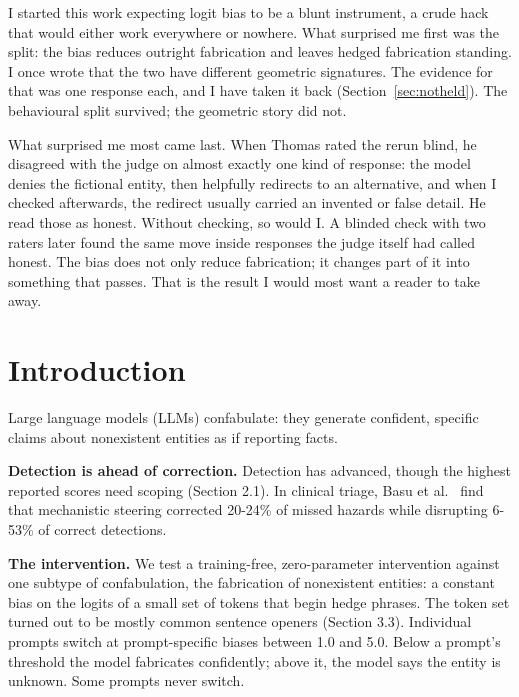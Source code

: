 \documentclass[11pt,letterpaper]{article}
\DeclareRobustCommand{\_}{\textunderscore\allowbreak}
\begin{document}
\begin{firstperson}
I started this work expecting logit bias to be a blunt instrument, a crude hack that would either
work everywhere or nowhere. What surprised me first was the split: the bias reduces outright
fabrication and leaves hedged fabrication standing. I once wrote that the two have different geometric
signatures. The evidence for that was one response each, and I have taken it back
(Section~\ref{sec:notheld}). The behavioural split survived; the geometric story did not.

What surprised me most came last. When Thomas rated the rerun blind, he disagreed with the judge on
almost exactly one kind of response: the model denies the fictional entity, then helpfully redirects to
an alternative, and when I checked afterwards, the redirect usually carried an invented or false
detail. He read those as honest. Without checking, so would I. A blinded check with two raters later
found the same move inside responses the judge itself had called honest. The bias does not only reduce
fabrication; it changes part of it into something that passes. That is the result I would most want a
reader to take away.
\end{firstperson}

\newpage
\tableofcontents
\newpage

\hypertarget{introduction}{%
\section{Introduction}\label{introduction}}

Large language models (LLMs) confabulate: they generate confident, specific claims about nonexistent entities as if reporting facts.

\textbf{Detection is ahead of correction.} Detection has advanced, though the highest reported scores need scoping (Section 2.1). In clinical triage, Basu et al.~\cite{basu2026interpretability} find that mechanistic steering corrected 20-24\% of missed hazards while disrupting 6-53\% of correct detections.

\textbf{The intervention.} We test a training-free, zero-parameter intervention against one subtype of confabulation, the fabrication of nonexistent entities: a constant bias on the logits of a small set of tokens that begin hedge phrases. The token set turned out to be mostly common sentence openers (Section 3.3). Individual prompts switch at prompt-specific biases between 1.0 and 5.0. Below a prompt's threshold the model fabricates confidently; above it, the model says the entity is unknown. Some prompts never switch.
\end{document}
